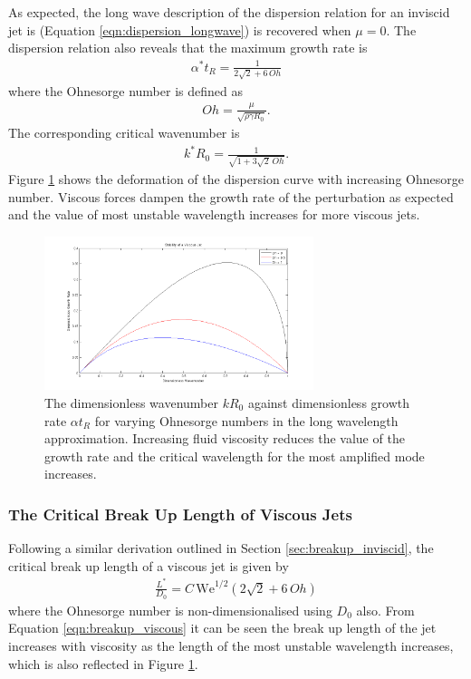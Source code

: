 \documentclass[11pt]{article}
\begin{document}
As expected, the long wave description of the dispersion relation for an inviscid jet is  (Equation \ref{eqn:dispersion_longwave}) is recovered when $\mu =0$. The dispersion relation also reveals that the maximum growth rate is 
\begin{align}
\alpha^*t_R = \frac{1}{2 \sqrt{2} + 6 \, Oh}
\label{eqn:visc_max_growth}
\end{align}
where the Ohnesorge number is defined as
\begin{align}
Oh = \frac{\mu}{\sqrt{\rho \gamma R_0}}.
\end{align}
The corresponding critical wavenumber is
\begin{align}
k^*R_0 = \frac{1}{\sqrt{1+ 3\sqrt{2} \, Oh}}.
\end{align}
Figure \ref{fig:dispersion_viscous} shows the deformation of the dispersion curve with increasing Ohnesorge number. Viscous forces dampen the growth rate of the perturbation as expected and the value of most unstable wavelength increases for more viscous jets.
\begin{figure}[ht]
\begin{center}
	\includegraphics[width = 0.7\textwidth]{img/dispersion_comparison_viscous.png}
	\caption{The dimensionless wavenumber $kR_0$ against dimensionless growth rate $\alpha t_R$ for varying Ohnesorge numbers in the long wavelength approximation. Increasing fluid viscosity reduces the value of the growth rate and the critical wavelength for the most amplified mode increases.}
	\label{fig:dispersion_viscous}
\end{center}
\end{figure}

\subsubsection{The Critical Break Up Length of Viscous Jets} \label{sec:breakup_length}
Following a similar derivation outlined in Section \ref{sec:breakup_inviscid}, the critical break up length of a viscous jet is given by
\begin{align}
\frac{L^*}{D_0} = C \, \mathrm{We}^{1/2}(2 \sqrt{2} + 6 \, Oh)
\label{eqn:breakup_viscous}
\end{align}
where the Ohnesorge number is non-dimensionalised using $D_0$ also. From Equation \ref{eqn:breakup_viscous} it can be seen the break up length of the jet increases with viscosity as the length of the most unstable wavelength increases, which is also reflected in Figure \ref{fig:dispersion_viscous}.
\end{document}
